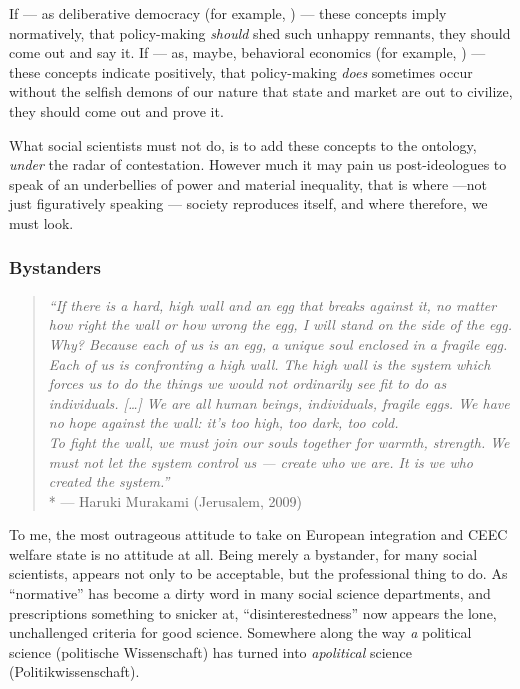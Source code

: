 If --- as deliberative democracy (for example, \citealt{Elster-1998-aa}) --- these concepts imply normatively, that policy-making \emph{should} shed such unhappy remnants, they should come out and say it.
If --- as, maybe, behavioral economics (for example, \citealt{Tomasello2009}) --- these concepts indicate positively, that policy-making \emph{does} sometimes occur without the selfish demons of our nature that state and market are out to civilize, they should come out and prove it.

What social scientists must not do, is to add these concepts to the ontology, \emph{under} the radar of contestation.
However much it may pain us post-ideologues to speak of \citeauthor{Agnoli-1989-aa}an underbellies of power and material inequality, that is where ---not just figuratively speaking --- society reproduces itself, and where therefore, we must look.

\subsubsection{Bystanders}

\begin{quotation}
	\emph{``If there is a hard, high wall and an egg that breaks against it, no matter how right the wall or how wrong the egg, I will stand on the side of the egg.
	\\
	Why?
	Because each of us is an egg, a unique soul enclosed in a fragile egg.
	Each of us is confronting a high wall.
	The high wall is the system which forces us to do the things we would not ordinarily see fit to do as individuals.
	[\ldots] We are all human beings, individuals, fragile eggs.
	We have no hope against the wall:
it's too high, too dark, too cold.
	\\
	To fight the wall, we must join our souls together for warmth, strength.
We must not let the system control us --- create who we are.
It is we who created the system.''}
	\\*
	--- Haruki Murakami (Jerusalem, 2009)
\end{quotation}

To me, the most outrageous attitude to take on European integration and \gls{CEEC} welfare state is no attitude at all.
Being merely a bystander, for many social scientists, appears not only to be acceptable, but the professional thing to do.
As ``normative'' has become a dirty word in many social science departments, and prescriptions something to snicker at, ``disinterestedness'' now appears the lone, unchallenged criteria for good science.
Somewhere along the way \emph{a} political science (politische Wissenschaft) has turned into \emph{apolitical} science (Politikwissenschaft).

